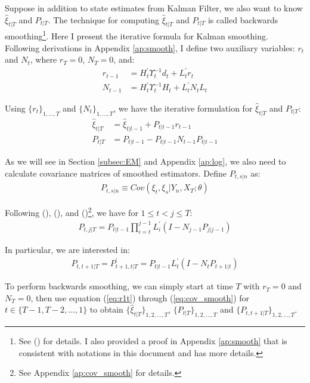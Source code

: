 \documentclass[10pt]{article}
\numberwithin{equation}{section}
\begin{document}
Suppose in addition to state estimates from Kalman Filter, we also want to know $\hat{\xi}_{t|T}$ and $P_{t|T}$. The technique for computing $\hat{\xi}_{t|T}$ and $P_{t|T}$ is called backwards smoothing\footnote{See (\cite{dejong_1989}) for details. I also provided a proof in Appendix \ref{ap:smooth} that is consistent with notations in this document and has more details.}. Here I present the iterative formula for Kalman smoothing. Following derivations in Appendix \ref{ap:smooth}, I define two auxiliary variables: $r_{t}$ and $N_{t}$, where $r_T=0$, $N_T=0$, and:
\begin{align}
    r_{t-1} &= H_t^{'}\Upsilon_t^{-1}d_t + L_t^{'}r_t \label{eq:r1t} \\
    N_{t-1} &= H_t^{'}\Upsilon_t^{-1}H_t + L_t^{'}N_tL_t \label{eq:N1t}
\end{align}

Using $\{r_t\}_{1,...,T}$ and $\{N_t\}_{1,...,T}$, we have the iterative formulation for $\hat{\xi}_{t|T}$ and $P_{t|T}$:
\begin{align}
    \hat{\xi}_{t|T} &= \hat{\xi}_{t|t-1} + P_{t|t-1}r_{t-1} \label{eq:smooth_state2} \\
    P_{t|T} &= P_{t|t-1}- P_{t|t-1}N_{t-1}P_{t|t-1} \label{eq:smooth_P2}
\end{align}

As we will see in Section \ref{subsec:EM} and Appendix \ref{ap:log}, we also need to calculate covariance matrices of smoothed estimators. Define $P_{t,s|n}$ as:
\begin{align*}
    P_{t,s|n}\equiv Cov(\xi_t,\xi_{s}|Y_n,X_T;\theta)
\end{align*}

Following (\cite{koopman_1992}), (\cite{dejong_1988}), and (\cite{dejong_1989})\footnote{See Appendix \ref{ap:cov_smooth} for details.}, we have for $1\leq t < j \leq T$:
\begin{align*}
    P_{t,j|T} = P_{t|t-1}\prod_{i=t}^{j-1}L_i^{'}(I-N_{j-1}P_{j|j-1}) 
\end{align*}

In particular, we are interested in:
\begin{align}
    P_{t,t+1|T} = P_{t+1,t|T}^{'} = P_{t|t-1}L_t^{'}(I-N_tP_{t+1|t}) \label{eq:cov_smooth}
\end{align}

To perform backwards smoothing, we can simply start at time $T$ with $r_T=0$ and $N_T=0$, then use equation (\ref{eq:r1t}) through (\ref{eq:cov_smooth}) for $t\in\{T-1,T-2,...,1\}$ to obtain $\{\hat{\xi}_{t|T}\}_{1,2,...,T}$, $\{P_{t|T}\}_{1,2,...,T}$ and $\{P_{t,t+1|T}\}_{1,2,...,T}$.
\end{document}
